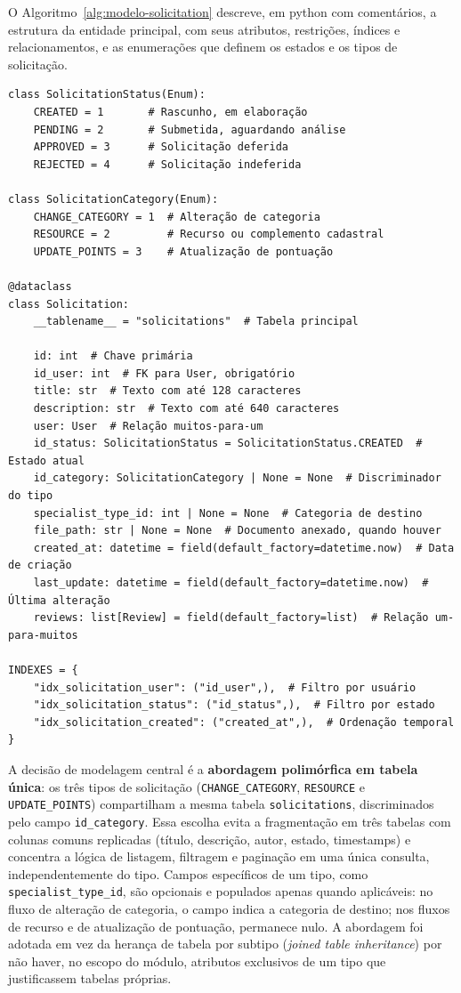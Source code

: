 O Algoritmo~\ref{alg:modelo-solicitation} descreve, em python com comentários, a 
estrutura da entidade principal, com seus atributos, restrições, índices 
e relacionamentos, e as enumerações que definem os estados e os tipos de 
solicitação.

\begin{algorithm}[htbp]
\caption{Estrutura da entidade \texttt{Solicitation} e enumerações de domínio em Python.}
\label{alg:modelo-solicitation}
\begin{verbatim}
class SolicitationStatus(Enum):
    CREATED = 1       # Rascunho, em elaboração
    PENDING = 2       # Submetida, aguardando análise
    APPROVED = 3      # Solicitação deferida
    REJECTED = 4      # Solicitação indeferida

class SolicitationCategory(Enum):
    CHANGE_CATEGORY = 1  # Alteração de categoria
    RESOURCE = 2         # Recurso ou complemento cadastral
    UPDATE_POINTS = 3    # Atualização de pontuação

@dataclass
class Solicitation:
    __tablename__ = "solicitations"  # Tabela principal

    id: int  # Chave primária
    id_user: int  # FK para User, obrigatório
    title: str  # Texto com até 128 caracteres
    description: str  # Texto com até 640 caracteres
    user: User  # Relação muitos-para-um
    id_status: SolicitationStatus = SolicitationStatus.CREATED  # Estado atual
    id_category: SolicitationCategory | None = None  # Discriminador do tipo
    specialist_type_id: int | None = None  # Categoria de destino
    file_path: str | None = None  # Documento anexado, quando houver
    created_at: datetime = field(default_factory=datetime.now)  # Data de criação
    last_update: datetime = field(default_factory=datetime.now)  # Última alteração
    reviews: list[Review] = field(default_factory=list)  # Relação um-para-muitos

INDEXES = {
    "idx_solicitation_user": ("id_user",),  # Filtro por usuário
    "idx_solicitation_status": ("id_status",),  # Filtro por estado
    "idx_solicitation_created": ("created_at",),  # Ordenação temporal
}
\end{verbatim}
\end{algorithm}

A decisão de modelagem central é a \textbf{abordagem polimórfica em tabela 
única}: os três tipos de solicitação (\texttt{CHANGE\_CATEGORY}, 
\texttt{RESOURCE} e \texttt{UPDATE\_POINTS}) compartilham a mesma tabela 
\texttt{solicitations}, discriminados pelo campo \texttt{id\_category}. 
Essa escolha evita a fragmentação em três tabelas com colunas comuns 
replicadas (título, descrição, autor, estado, timestamps) e concentra a 
lógica de listagem, filtragem e paginação em uma única consulta, 
independentemente do tipo. Campos específicos de um tipo, como 
\texttt{specialist\_type\_id}, são opcionais e populados apenas quando 
aplicáveis: no fluxo de alteração de categoria, o campo indica a categoria 
de destino; nos fluxos de recurso e de atualização de pontuação, permanece 
nulo. A abordagem foi adotada em vez da herança de tabela por subtipo 
(\textit{joined table inheritance}) por não haver, no escopo do módulo, 
atributos exclusivos de um tipo que justificassem tabelas próprias.

